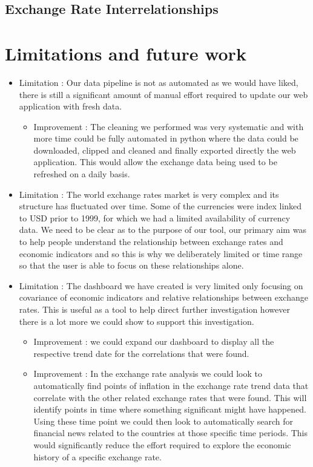 \subsection{Exchange Rate Interrelationships}

\section{Limitations and future work}

\begin{itemize}
	\item Limitation : Our data pipeline is not as automated as we would have liked, there is still a significant amount of manual effort required to update our web application with fresh data.
	\begin{itemize}
		\item Improvement : The cleaning we performed was very systematic and with more time could be fully automated in python where the data could be downloaded, clipped and cleaned and finally exported directly the web application.  This would allow the exchange data being used to be refreshed on a daily basis.
	\end{itemize} 
	\item Limitation : The world exchange rates market is very complex and its structure has fluctuated over time. Some of the currencies were index linked to USD prior to 1999, for which we had a limited availability of currency data.  We need to be clear as to the purpose of our tool, our primary aim was to help people understand the relationship between exchange rates and economic indicators and so this is why we deliberately limited or time range so that the user is able to focus on these relationships alone.
	\item Limitation : The dashboard we have created is very limited only focusing on covariance of economic indicators and relative relationships between exchange rates.  This is useful as a tool to help direct further investigation however there is a lot more we could show to support this investigation.
	\begin{itemize}
		\item Improvement : we could expand our dashboard to display all the respective trend date for the correlations that were found.
		\item Improvement : In the exchange rate analysis we could look to automatically find points of inflation in the exchange rate trend data that correlate with the other related exchange rates that were found.  This will identify points in time where something significant might have happened.  Using these time point we could then look to automatically search for financial news related to the countries at those specific time periods.  This would significantly reduce the effort required to explore the economic history of a specific exchange rate.
	\end{itemize}
	
\end{itemize}






